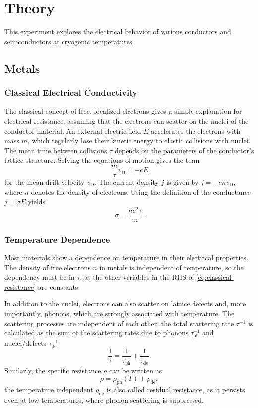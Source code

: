\chapter{Theory}
This experiment explores the electrical behavior of various conductors and semiconductors at cryogenic temperatures.

\section{Metals}

\subsection{Classical Electrical Conductivity}
The classical concept of free, localized electrons gives a simple explanation for electrical resistance, assuming that the electrons can scatter on the nuclei of the conductor material.
An external electric field $E$ accelerates the electrons with mass $m$, which regularly lose their kinetic energy to elastic collisions with nuclei.
The mean time between collisions $\tau$ depends on the parameters of the conductor's lattice structure.
Solving the equations of motion gives the term
\begin{equation*}
	\frac{m}{\tau} v_\text{D} = - e E
\end{equation*}
for the mean drift velocity $v_\text{D}$. The current density $j$ is given by $j = - e n v_\text{D}$, where $n$ denotes the density of electrons.
Using the definition of the conductance $j = \sigma E$ yields
\begin{equation}\label{eq:classical-resistance}
	\sigma = \frac{n e^2 \tau}{m}.
\end{equation}

\subsection{Temperature Dependence}
Most materials show a dependence on temperature in their electrical properties.
The density of free electrons $n$ in metals is independent of temperature, so the dependency must be in $\tau$, as the other variables in the RHS of \autoref{eq:classical-resistance} are constants.

In addition to the nuclei, electrons can also scatter on lattice defects and, more importantly, phonons, which are strongly associated with temperature.
The scattering processes are independent of each other, the total scattering rate $\tau^{-1}$ is calculated as the sum of the scattering rates due to phonons $\tau_\text{ph}^{-1}$ and nuclei/defects $\tau_\text{de}^{-1}$
\begin{equation*}
	\frac{1}{\tau} = \frac{1}{\tau_\text{ph}} + \frac{1}{\tau_\text{de}}.
\end{equation*}
Similarly, the specific resistance $\rho$ can be written as
\begin{equation*}
	\rho = \rho_\text{ph}(T) + \rho_\text{de},
\end{equation*}
the temperature independent $\rho_\text{de}$ is also called residual resistance, as it persists even at low temperatures, where phonon scattering is suppressed.

